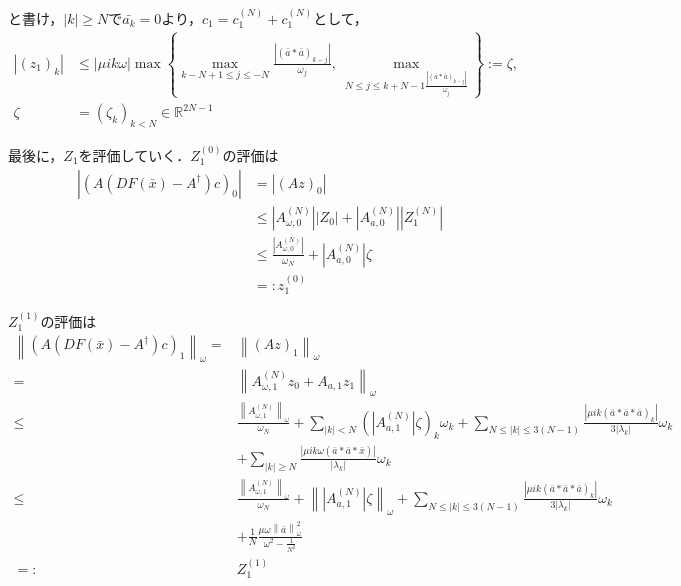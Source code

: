 \documentclass[11pt,a4paper,titlepage]{jsreport}
\theoremstyle{definition}
\begin{document}
と書け，$|k| \geq N で \bar{a_k} = 0$より，$c_1 = c_1^{(N)} + c_1^{(N)}$として，
\begin{align*}
  |(z_1)_k| & \leq |\mu ik \omega| \max \left\{ \max_{k-N+1\leq j \leq -N} \frac{|\left( \bar{a} * \bar{a} \right)_{k-j}|}{\omega_j} ,\ \max_{N \leq j \leq k+N-1 \frac{|\left( \bar{a} * \bar{a}\right)_{k-j} |}{\omega_j}} \right\} := \zeta, \\
  \zeta     & = (\zeta_k)_{k < N} \in \mathbb{R}^{2N-1}
\end{align*}

最後に，$Z_1$を評価していく．$Z_1^{(0)}$の評価は
\begin{align*}
  |(A(DF(\bar{x})-A^\dagger)c)_0| & = |(Az)_0|                                                                                                \\
                                  & \leq \left|A_{\omega,0}^{(N)}\right| \left|Z_0\right| + \left|A_{a,0}^{(N)}\right| \left|Z_1^{(N)}\right| \\
                                  & \leq \frac{|A_{\omega, 0}^{(N)}|}{\omega_N} + \left|A_{a,0}^{(N)}\right| \zeta                            \\
                                  & =: z_1^{(0)}
\end{align*}

$Z_1^{(1)}$の評価は
\begin{equation*}
  \begin{split}
    \left\| (A(DF(\bar{x})-A^\dagger)c)_1 \right\|_\omega =& \left\| (Az)_1 \right\|_\omega \\
    =& \left\| A_{\omega,1}^{(N)} z_0 + A_{a,1} z_1 \right\|_\omega \\
    \leq& \frac{\left\| A_{\omega,1}^{(N)} \right\|_\omega}{\omega_N} + \sum_{|k|<N} \left( \left| A_{a,1}^{(N)} \right| \zeta \right)_k \omega_k + \sum_{N \leq |k| \leq 3(N-1)} \frac{\left| \mu ik \left( \bar{a} * \bar{a} * \bar{a} \right)_k \right|}{3\left| \lambda_k \right|} \omega_k \\
    &+ \sum_{|k| \geq N} \frac{\left| \mu ik \omega \left(\bar{a}*\bar{a}*\bar{x}\right) \right|}{\left| \lambda_k \right|} \omega_k \\
    \leq& \frac{\left\| A_{\omega,1}^{(N)} \right\|_\omega}{\omega_N} + \left\| \left| A_{a,1}^{(N)} \right| \zeta \right\|_\omega + \sum_{N\leq|k|\leq 3(N-1)} \frac{\left| \mu ik \left( \bar{a} * \bar{a} * \bar{a} \right)_k \right|}{3\left| \lambda_k \right|} \omega_k \\
    &+ \frac{1}{N} \frac{\mu \omega \left\|\bar{a}\right\|_\omega^2}{\omega^2-\frac{1}{N^2}}\\
    =:& Z_1^{(1)}
  \end{split}
\end{equation*}
\end{document}
